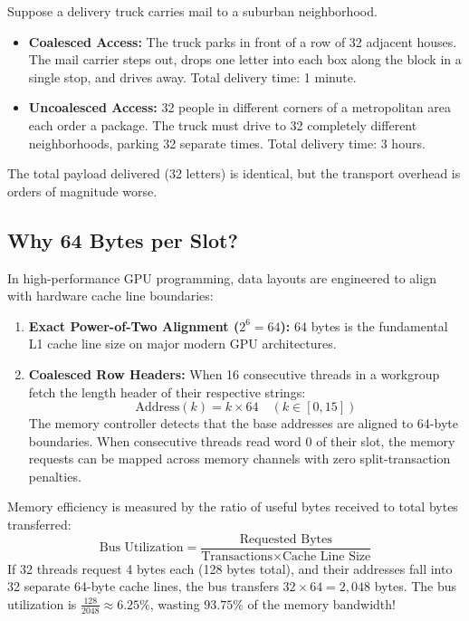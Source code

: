 \documentclass[a4paper,11pt]{article}
\begin{document}
\begin{analogybox}
Suppose a delivery truck carries mail to a suburban neighborhood. 
\begin{itemize}
  \item \textbf{Coalesced Access:} The truck parks in front of a row of 32 adjacent houses. The mail carrier steps out, drops one letter into each box along the block in a single stop, and drives away. Total delivery time: 1 minute.
  \item \textbf{Uncoalesced Access:} 32 people in different corners of a metropolitan area each order a package. The truck must drive to 32 completely different neighborhoods, parking 32 separate times. Total delivery time: 3 hours.
\end{itemize}
The total payload delivered (32 letters) is identical, but the transport overhead is orders of magnitude worse.
\end{analogybox}

\subsection{Why 64 Bytes per Slot?}

In high-performance GPU programming, data layouts are engineered to align with hardware cache line boundaries:
\begin{enumerate}
  \item \textbf{Exact Power-of-Two Alignment ($2^6 = 64$):} 64 bytes is the fundamental L1 cache line size on major modern GPU architectures.
  \item \textbf{Coalesced Row Headers:} When 16 consecutive threads in a workgroup fetch the length header of their respective strings:
  \begin{equation}
    \text{Address}(k) = k \times 64 \quad (k \in [0, 15])
  \end{equation}
  The memory controller detects that the base addresses are aligned to 64-byte boundaries. When consecutive threads read word 0 of their slot, the memory requests can be mapped across memory channels with zero split-transaction penalties.
\end{enumerate}

\begin{expertbox}
Memory efficiency is measured by the ratio of useful bytes received to total bytes transferred:
\begin{equation}
  \text{Bus Utilization} = \frac{\text{Requested Bytes}}{\text{Transactions} \times \text{Cache Line Size}}
\end{equation}
If 32 threads request 4 bytes each (128 bytes total), and their addresses fall into 32 separate 64-byte cache lines, the bus transfers $32 \times 64 = 2,048$ bytes. The bus utilization is $\frac{128}{2048} \approx 6.25\%$, wasting $93.75\%$ of the memory bandwidth!
\end{expertbox}
\end{document}
